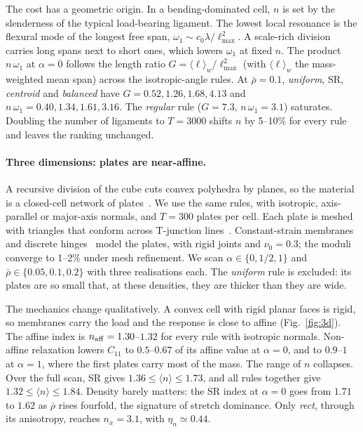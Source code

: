 \documentclass[aps,prl,twocolumn,superscriptaddress,amsmath,amssymb,floatfix]{revtex4-2}
\begin{document}
The cost has a geometric origin. In a bending-dominated cell, $n$ is set by the
slenderness of the typical load-bearing ligament. The lowest local resonance is the
flexural mode of the longest free span, $\omega_1\sim c_0\lambda/\ell_{\max}^2$. A
scale-rich division carries long spans next to short ones, which lowers $\omega_1$ at
fixed $n$. The product $n\,\omega_1$ at $\alpha=0$ follows the length ratio
$G=\langle\ell\rangle_w/\ell_{\max}^2$ (with $\langle\ell\rangle_w$ the mass-weighted
mean span) across the isotropic-angle rules. At $\bar\rho=0.1$, \emph{uniform}, SR,
\emph{centroid} and \emph{balanced} have $G=0.52,1.26,1.68,4.13$ and
$n\,\omega_1=0.40,1.34,1.61,3.16$. The \emph{regular} rule ($G=7.3$, $n\,\omega_1=3.1$)
saturates. Doubling the number of ligaments to $T=3000$ shifts $n$ by 5--10\% for every
rule and leaves the ranking unchanged.

\paragraph*{Three dimensions: plates are near-affine.}
A recursive division of the cube cuts convex polyhedra by planes, so the material is a
closed-cell network of plates~\cite{both2026}. We use the same rules, with isotropic,
axis-parallel or major-axis normals, and $T=300$ plates per cell. Each plate is meshed
with triangles that conform across T-junction lines~\cite{shewchuk1996}. Constant-strain
membranes and discrete hinges~\cite{grinspun2003} model the plates, with rigid joints and
$\nu_0=0.3$; the moduli converge to 1--2\% under mesh refinement. We scan
$\alpha\in\{0,1/2,1\}$ and $\bar\rho\in\{0.05,0.1,0.2\}$ with three realisations each.
The \emph{uniform} rule is excluded: its plates are so small that, at these densities,
they are thicker than they are wide.

The mechanics change qualitatively. A convex cell with rigid planar faces is rigid, so
membranes carry the load and the response is close to affine (Fig.~\ref{fig:3d}). The
affine index is $n_{\rm aff}=1.30$--$1.32$ for every rule with isotropic normals.
Non-affine relaxation lowers $C_{11}$ to $0.5$--$0.67$ of its affine value at
$\alpha=0$, and to $0.9$--$1$ at $\alpha=1$, where the first plates carry most of the
mass. The range of $n$ collapses. Over the full scan, SR gives
$1.36\le\langle n\rangle\le1.73$, and all rules together give
$1.32\le\langle n\rangle\le1.84$. Density barely matters: the SR index at $\alpha=0$
goes from $1.71$ to $1.62$ as $\bar\rho$ rises fourfold, the signature of stretch
dominance. Only \emph{rect}, through its anisotropy, reaches $n_x=3.1$, with
$\eta_n\simeq0.44$.
\end{document}
